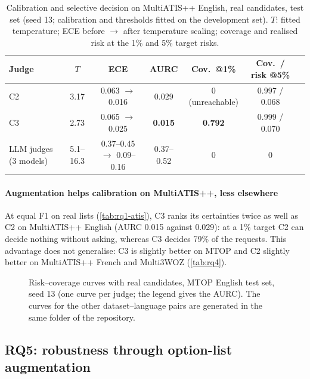 \begin{table}[pos=t]
\centering
\small
\caption{Calibration and selective decision on MultiATIS++ English, real candidates, test set (seed 13; calibration and thresholds fitted on the development set). $T$: fitted temperature; ECE before $\rightarrow$ after temperature scaling; coverage and realised risk at the 1\% and 5\% target risks.}
\label{tab:rq4-atis}
\begin{tabular}{@{}lcccccc@{}}
\toprule
Judge & $T$ & ECE & AURC & Cov.\ @1\% & Cov.\ / risk @5\% \\
\midrule
C2 & 3.17 & 0.063 $\rightarrow$ 0.016 & 0.029 & 0 (unreachable) & 0.997 / 0.068 \\
C3 & 2.73 & 0.065 $\rightarrow$ 0.025 & \textbf{0.015} & \textbf{0.792} & 0.999 / 0.070 \\
LLM judges (3 models) & 5.1--16.3 & 0.37--0.45 $\rightarrow$ 0.09--0.16 & 0.37--0.52 & 0 & 0 \\
\bottomrule
\end{tabular}
\end{table}

\paragraph{Augmentation helps calibration on MultiATIS++, less elsewhere} At equal F1 on real lists (\cref{tab:rq1-atis}), C3 ranks its certainties twice as well as C2 on MultiATIS++ English (AURC 0.015 against 0.029): at a 1\% target C2 can decide nothing without asking, whereas C3 decides 79\% of the requests. This advantage does not generalise: C3 is slightly better on MTOP and C2 slightly better on MultiATIS++ French and Multi3WOZ (\cref{tab:rq4}).

\begin{figure}[pos=t]
\centering
{}
\caption{Risk--coverage curves with real candidates, MTOP English test set, seed 13 (one curve per judge; the legend gives the AURC). The curves for the other dataset--language pairs are generated in the same folder of the repository.}
\label{fig:risk}
\end{figure}

\subsection{RQ5: robustness through option-list augmentation}
\label{sec:rq5}

